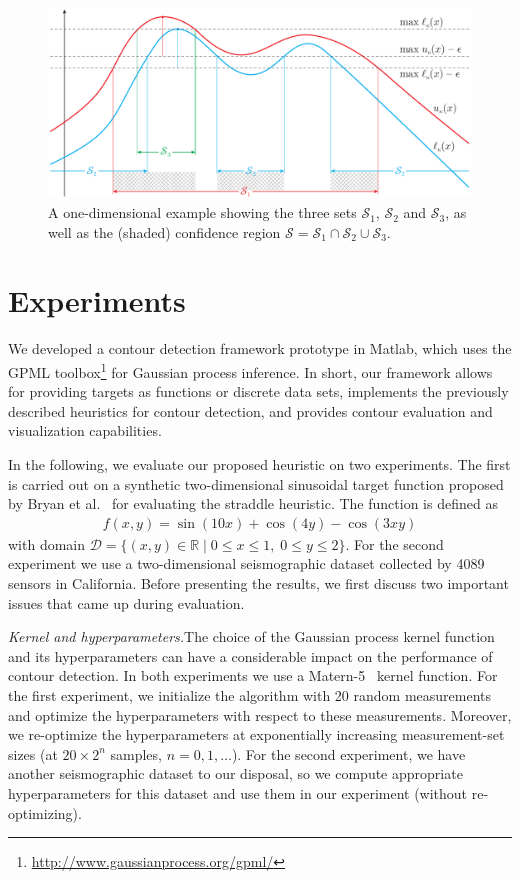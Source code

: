 \documentclass[11pt]{article} %
\begin{document}
\begin{figure}[tb]
  \centering
  \includegraphics[width=\textwidth]{figures/cb_eps}
  \caption{A one-dimensional example showing the three sets $\mathcal{S}_1$,
           $\mathcal{S}_2$ and $\mathcal{S}_3$, as well as
           the (shaded) confidence region
           $\mathcal{S} = \mathcal{S}_1\cap\mathcal{S}_2\cup\mathcal{S}_3$.}
  \label{fig:cbe}
  \vspace{-0.5em}
\end{figure}

\section{Experiments} \label{sect:exp}
We developed a contour detection framework prototype in Matlab, which uses the
GPML toolbox\footnote{\url{http://www.gaussianprocess.org/gpml/}} for
Gaussian process inference. In short, our framework allows for providing
targets as functions or discrete data sets,
implements the previously described heuristics for contour detection, and
provides contour evaluation and visualization capabilities.

In the following, we evaluate our proposed heuristic on two experiments.
The first is carried out on a synthetic two-dimensional sinusoidal target
function proposed by Bryan et al.~\cite{bryan2005} for evaluating the straddle
heuristic. The function is defined as
\begin{align*}
  f(x, y) = \sin(10x) + \cos(4y) - \cos(3xy)
\end{align*}
with domain
$\mathcal{D} = \{(x, y) \in \mathbb{R} \mid 0 \leq x \leq 1,\;0 \leq y \leq 2\}$.
For the second experiment we use a two-dimensional seismographic dataset
collected by 4089 sensors in California.
Before presenting the results, we first discuss two important issues that came up
during evaluation.

\noindent\emph{Kernel and hyperparameters.}\;The choice of the Gaussian process
kernel function and its hyperparameters can have a considerable impact on the
performance of contour detection. In both experiments we use a
Matern-5~\cite{gpbook} kernel function. For the first experiment, we initialize
the algorithm with 20 random measurements and optimize the hyperparameters with
respect to these measurements. Moreover, we re-optimize the hyperparameters at
exponentially increasing measurement-set sizes
(at $20\times 2^n$ samples, $n = 0, 1,\ldots$).
For the second experiment, we have another seismographic dataset
to our disposal, so we compute appropriate hyperparameters for this
dataset and use them in our experiment (without re-optimizing).
\end{document}
